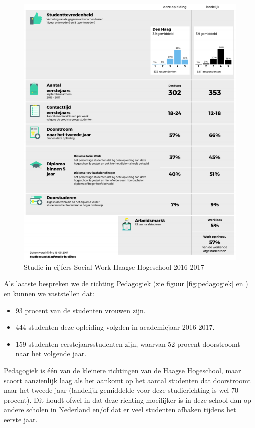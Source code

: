 \begin{figure}
	\includegraphics[width=\textwidth]
	{img/socialwork.png}
	\caption{Studie in cijfers Social Work Haagse Hogeschool 2016-2017 \autocite{Studiekeuze2017}}
	\label{fig:socialwork} 
\end{figure}

Als laatste bespreken we de richting Pedagogiek (zie figuur \ref{fig:pedagogiek} en \textcite{Studiekeuze2017}) en kunnen we vaststellen dat:
\begin{itemize}
	\item 93 procent van de studenten vrouwen zijn.
	\item 444 studenten deze opleiding volgden in academiejaar 2016-2017.
	\item 159 studenten eerstejaarsstudenten zijn, waarvan 52 procent doorstroomt naar het volgende jaar.
\end{itemize}

Pedagogiek is één van de kleinere richtingen van de Haagse Hogeschool, maar scoort aanzienlijk laag als het aankomt op het aantal studenten dat doorstroomt naar het tweede jaar (landelijk gemiddelde voor deze studierichting is wel 70 procent). Dit houdt ofwel in dat deze richting moeilijker is in deze school dan op andere scholen in Nederland en/of dat er veel studenten afhaken tijdens het eerste jaar. 


